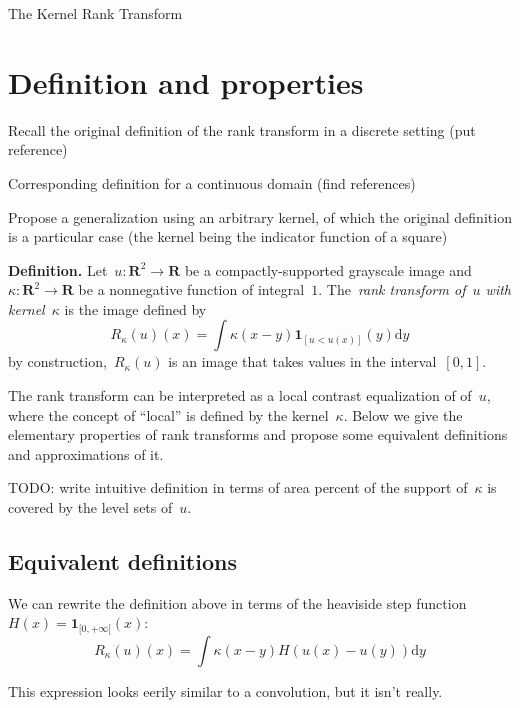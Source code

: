 \documentclass[12pt]{article}                  %
\begin{document}
\begin{center}
    \Huge The Kernel Rank Transform
\end{center}

\bigskip

\section{Definition and properties}

Recall the original definition of the rank transform in a discrete setting
(put reference)

Corresponding definition for a continuous domain (find references)

Propose a generalization using an arbitrary kernel, of which the original
definition is a particular case (the kernel being the indicator function of
a square)

{\bf Definition.}
Let~$u:\mathbf{R}^2\to\mathbf{R}$ be a compactly-supported grayscale image
and~$\kappa:\mathbf{R}^2\to\mathbf{R}$ be a nonnegative function of
integral~$1$.  The~\emph{rank transform of~$u$ with kernel~$\kappa$} is the
image defined by
\begin{equation}
R_{\kappa}(u)(x) = \int\kappa(x-y)\mathbf{1}_{\left[u < u(x)\right]}(y)\mathrm{d}y
\end{equation}
by construction,~$R_\kappa(u)$ is an image that takes values in the
interval~$[0,1]$.

The rank transform can be interpreted as a local contrast equalization of
of~$u$, where the concept of ``local'' is defined by the kernel~$\kappa$.
Below we give the elementary properties of rank transforms and propose some
equivalent definitions and approximations of it.

TODO: write intuitive definition in terms of area percent of the support
of~$\kappa$ is covered by the level sets of~$u$.

\subsection{Equivalent definitions}

We can rewrite the definition above in terms of the heaviside step
function~$H(x)=\mathbf{1}_{[0,+\infty[}(x)$:
\begin{equation}
R_\kappa(u)(x)=
\int
\kappa(x-y)
H\left(u\left(x\right)-u\left(y\right)\right)
\mathrm{d} y
\end{equation}

This expression looks eerily similar to a convolution, but it isn't really.
\end{document}
